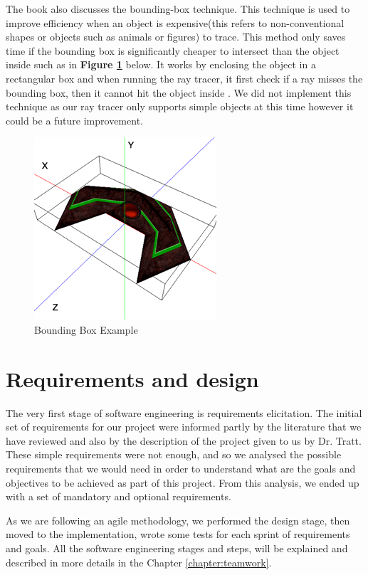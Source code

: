 \documentclass[a4paper]{report}
\begin{document}
	\par The book also discusses the bounding-box technique. This technique is used to improve efficiency when an object is expensive(this refers to non-conventional shapes or objects such as animals or figures) to trace. This method only saves time if the bounding box is significantly cheaper to intersect than the object inside such as in \textbf{Figure \ref{fig:boundingbox}} below. It works by enclosing the object in a rectangular box and when running the ray tracer, it first check if a ray misses the bounding box, then it cannot hit the object inside \cite{suffern_ray_2007}. We did not implement this technique as our ray tracer only supports simple objects at this time however it could be a future improvement.
	
	\begin{figure}[ht!]
		\centering
		\includegraphics[scale=0.60]{./boundingbox.png}
		\caption{Bounding Box Example}
		\label{fig:boundingbox}
	\end{figure}
	
	\chapter{Requirements and design} \label{chapter:requirements}
	The very first stage of software engineering is requirements elicitation. The initial set of requirements for our project were informed partly by the literature that we have reviewed and also by the description of the project given to us by Dr. Tratt. These simple requirements were not enough, and so we analysed the possible requirements that we would need in order to understand what are the goals and objectives to be achieved as part of this project. From this analysis, we ended up with a set of mandatory and optional requirements.\newline
	\par As we are following an agile methodology, we performed the design stage, then moved to the implementation, wrote some tests for each sprint of requirements and goals. All the software engineering stages and steps, will be explained and described in more details in the Chapter \ref{chapter:teamwork}.
	
\end{document}
